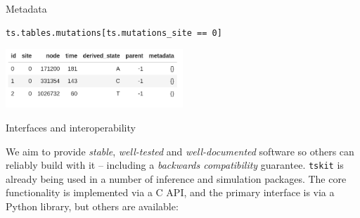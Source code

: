 \documentclass[landscape,a0paper,fontscale=0.4]{baposter}
\newcommand{\tskit}{{\texttt{tskit}}}
\begin{document}
\begin{poster}
\begin{posterbox}[name=inout,column=0,span=1,above=bottom]{Metadata}
\begin{multicols}{2}
\begin{verbatim}
ts.tables.mutations[ts.mutations_site == 0]
\end{verbatim}
\includegraphics[width=0.5\textwidth]{sc2_muts}
\end{multicols}

% 

\end{posterbox}

\begin{posterbox}[name=interop,column=0,row=0,span=1]{Interfaces and interoperability}


We aim to provide \emph{stable}, \emph{well-tested} and \emph{well-documented}
software so others can reliably build with it --
including a \emph{backwards compatibility} guarantee.
\tskit{} is already being used in a number of inference and simulation packages.
The core functionality is implemented via a C API,
and the primary interface is via a Python library,
but others are available:


\end{posterbox}
\end{poster}
\end{document}
